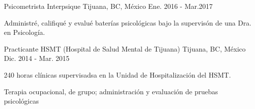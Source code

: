 \vspace{-3.2mm}
\begin{cventries}
    \cventry
        {Psicometrista}
        {Interpsique}
        {Tijuana, BC, México}
        {Ene. 2016 - Mar.2017}
        {
            \begin{cvitems}
                \item {Administré, califiqué y evalué baterías psicológicas bajo la supervisón de una Dra. en Psicología.}
            \end{cvitems}
        }
    \cventry
        {Practicante}
        {HSMT (Hospital de Salud Mental de Tijuana)}
        {Tijuana, BC, México}
        {Dic. 2014 - Mar. 2015}
        {
            \begin{cvitems}
                \item {240 horas clínicas supervisadsa en la Unidad de Hospitalización del HSMT.}
                \item {Terapia ocupacional, de grupo; administración y evaluación de pruebas psicológicas}
            \end{cvitems}
        }
\end{cventries}
